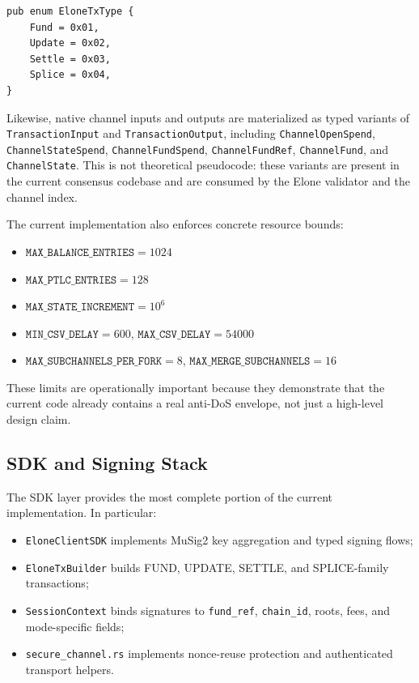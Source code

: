 \begin{lstlisting}[caption={Implemented Elone Transaction Taxonomy}, float=!htb]
pub enum EloneTxType {
    Fund = 0x01,
    Update = 0x02,
    Settle = 0x03,
    Splice = 0x04,
}
\end{lstlisting}

Likewise, native channel inputs and outputs are materialized as typed variants of \texttt{TransactionInput} and \texttt{TransactionOutput}, including \texttt{ChannelOpenSpend}, \texttt{ChannelStateSpend}, \texttt{ChannelFundSpend}, \texttt{ChannelFundRef}, \texttt{ChannelFund}, and \texttt{ChannelState}. This is not theoretical pseudocode: these variants are present in the current consensus codebase and are consumed by the Elone validator and the channel index.

The current implementation also enforces concrete resource bounds:
\begin{itemize}
    \item $\texttt{MAX\_BALANCE\_ENTRIES} = 1024$
    \item $\texttt{MAX\_PTLC\_ENTRIES} = 128$
    \item $\texttt{MAX\_STATE\_INCREMENT} = 10^6$
    \item $\texttt{MIN\_CSV\_DELAY} = 600$, $\texttt{MAX\_CSV\_DELAY} = 54000$
    \item $\texttt{MAX\_SUBCHANNELS\_PER\_FORK} = 8$, $\texttt{MAX\_MERGE\_SUBCHANNELS} = 16$
\end{itemize}

These limits are operationally important because they demonstrate that the current code already contains a real anti-DoS envelope, not just a high-level design claim.

\subsection{SDK and Signing Stack}

The SDK layer provides the most complete portion of the current implementation. In particular:
\begin{itemize}
    \item \texttt{EloneClientSDK} implements MuSig2 key aggregation and typed signing flows;
    \item \texttt{EloneTxBuilder} builds FUND, UPDATE, SETTLE, and SPLICE-family transactions;
    \item \texttt{SessionContext} binds signatures to \texttt{fund\_ref}, \texttt{chain\_id}, roots, fees, and mode-specific fields;
    \item \texttt{secure\_channel.rs} implements nonce-reuse protection and authenticated transport helpers.
\end{itemize}

